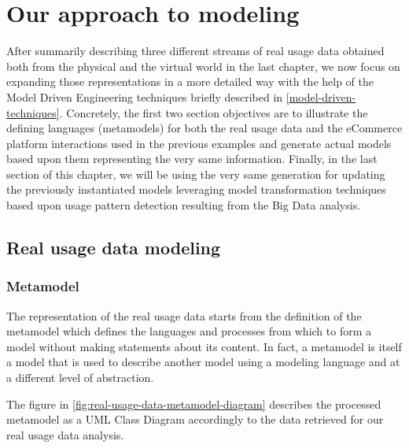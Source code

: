 \chead{}
\chapter{Our approach to modeling}

After summarily describing three different streams of real usage data obtained both from the physical and the virtual world in the last chapter, we now focus on expanding those representations in a more detailed way with the help of the Model Driven Engineering techniques briefly described in \ref{model-driven-techniques}. 
Concretely, the first two section objectives are to illustrate the defining languages (metamodels) for both the real usage data and the eCommerce platform interactions used in the previous examples and generate actual models based upon them representing the very same information.
Finally, in the last section of this chapter, we will be using the very same generation for updating the previously instantiated models leveraging model transformation techniques based upon usage pattern detection resulting from the Big Data analysis.

\section{Real usage data modeling}

\subsection{Metamodel}

The representation of the real usage data starts from the definition of the metamodel which defines the languages and processes from which to form a model without making statements about its content. In fact, a metamodel is itself a model that is used to describe another model using a modeling language and at a different level of abstraction.  

The figure in \ref{fig:real-usage-data-metamodel-diagram} describes the processed metamodel as a UML Class Diagram accordingly to the data retrieved for our real usage data analysis.

